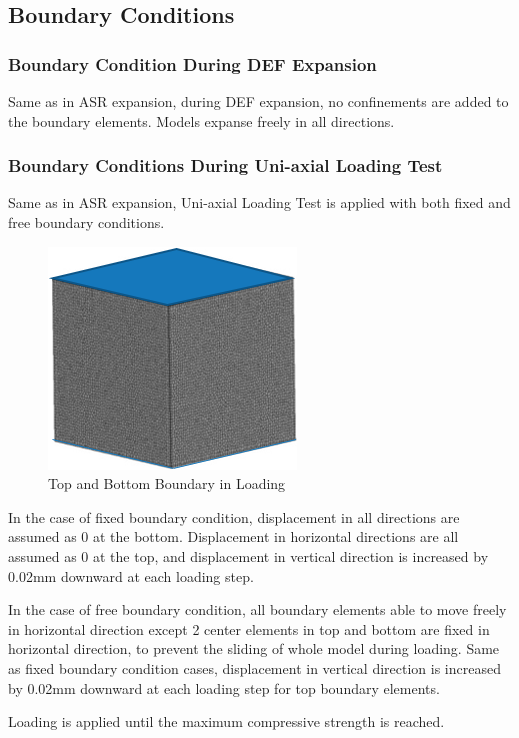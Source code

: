 \subsection{Boundary Conditions}

\subsubsection{Boundary Condition During DEF Expansion}

Same as in ASR expansion, during DEF expansion, no confinements are added to the boundary elements. Models expanse freely in all directions.

\subsubsection{Boundary Conditions During Uni-axial Loading Test}

Same as in ASR expansion, Uni-axial Loading Test is applied with both fixed and free boundary conditions.

\begin{figure}[h!]
  \centering
  \includegraphics{Files/Background/LOAD.png}
  \caption{Top and Bottom Boundary in Loading}
  \label{boundary}
\end{figure}

In the case of fixed boundary condition, displacement in all directions are assumed as 0 at the bottom. Displacement in horizontal directions are all assumed as 0 at the top, and displacement in vertical direction is increased by 0.02mm downward at each loading step.

In the case of free boundary condition, all boundary elements able to move freely in horizontal direction except 2 center elements in top and bottom are fixed in horizontal direction, to prevent the sliding of whole model during loading. Same as fixed boundary condition cases, displacement in vertical direction is increased by 0.02mm downward at each loading step for top boundary elements.

Loading is applied until the maximum compressive strength is reached.
